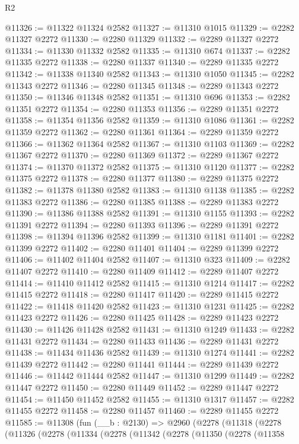 \begin{lexlean}{R2}
\begin{coremodule}
@11326 := @11322 @11324 @2582
@11327 := @11310 @1015
@11329 := @2282 @11327 @2272
@11330 := @2280 @11329
@11332 := @2289 @11327 @2272
@11334 := @11330 @11332 @2582
@11335 := @11310 @674
@11337 := @2282 @11335 @2272
@11338 := @2280 @11337
@11340 := @2289 @11335 @2272
@11342 := @11338 @11340 @2582
@11343 := @11310 @1050
@11345 := @2282 @11343 @2272
@11346 := @2280 @11345
@11348 := @2289 @11343 @2272
@11350 := @11346 @11348 @2582
@11351 := @11310 @696
@11353 := @2282 @11351 @2272
@11354 := @2280 @11353
@11356 := @2289 @11351 @2272
@11358 := @11354 @11356 @2582
@11359 := @11310 @1086
@11361 := @2282 @11359 @2272
@11362 := @2280 @11361
@11364 := @2289 @11359 @2272
@11366 := @11362 @11364 @2582
@11367 := @11310 @1103
@11369 := @2282 @11367 @2272
@11370 := @2280 @11369
@11372 := @2289 @11367 @2272
@11374 := @11370 @11372 @2582
@11375 := @11310 @1120
@11377 := @2282 @11375 @2272
@11378 := @2280 @11377
@11380 := @2289 @11375 @2272
@11382 := @11378 @11380 @2582
@11383 := @11310 @1138
@11385 := @2282 @11383 @2272
@11386 := @2280 @11385
@11388 := @2289 @11383 @2272
@11390 := @11386 @11388 @2582
@11391 := @11310 @1155
@11393 := @2282 @11391 @2272
@11394 := @2280 @11393
@11396 := @2289 @11391 @2272
@11398 := @11394 @11396 @2582
@11399 := @11310 @1181
@11401 := @2282 @11399 @2272
@11402 := @2280 @11401
@11404 := @2289 @11399 @2272
@11406 := @11402 @11404 @2582
@11407 := @11310 @323
@11409 := @2282 @11407 @2272
@11410 := @2280 @11409
@11412 := @2289 @11407 @2272
@11414 := @11410 @11412 @2582
@11415 := @11310 @1214
@11417 := @2282 @11415 @2272
@11418 := @2280 @11417
@11420 := @2289 @11415 @2272
@11422 := @11418 @11420 @2582
@11423 := @11310 @1231
@11425 := @2282 @11423 @2272
@11426 := @2280 @11425
@11428 := @2289 @11423 @2272
@11430 := @11426 @11428 @2582
@11431 := @11310 @1249
@11433 := @2282 @11431 @2272
@11434 := @2280 @11433
@11436 := @2289 @11431 @2272
@11438 := @11434 @11436 @2582
@11439 := @11310 @1274
@11441 := @2282 @11439 @2272
@11442 := @2280 @11441
@11444 := @2289 @11439 @2272
@11446 := @11442 @11444 @2582
@11447 := @11310 @1299
@11449 := @2282 @11447 @2272
@11450 := @2280 @11449
@11452 := @2289 @11447 @2272
@11454 := @11450 @11452 @2582
@11455 := @11310 @1317
@11457 := @2282 @11455 @2272
@11458 := @2280 @11457
@11460 := @2289 @11455 @2272
@11585 := @11308
    (fun (__b : @2130) =>
    @2960
      (@2278
        (@11318
          (@2278
            (@11326
              (@2278
                (@11334
                  (@2278
                    (@11342
                      (@2278
                        (@11350
                          (@2278
                            (@11358

\end{coremodule}
\end{lexlean}
